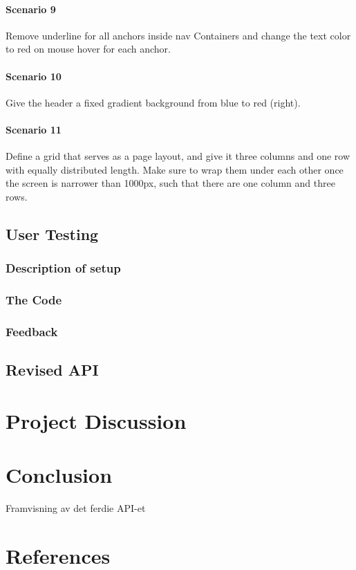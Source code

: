 \documentclass[12pt]{article}
\begin{document}
    \paragraph{Scenario 9}
    Remove underline for all anchors inside nav Containers and change the text color to red on mouse hover for each anchor.
        
    \paragraph{Scenario 10}
    Give the header a fixed gradient background from blue to red (right).

    \paragraph{Scenario 11}
    Define a grid that serves as a page layout, and give it three columns and one row with equally distributed length. Make sure to wrap them under each other once the screen is narrower than 1000px, such that there are one column and three rows.

\subsection{User Testing}

    \subsubsection{Description of setup}

    \subsubsection{The Code}

    \subsubsection{Feedback}

\subsection{Revised API}

\section{Project Discussion}

\section{Conclusion}
Framvisning av det ferdie API-et

\section{References}
\end{document}
